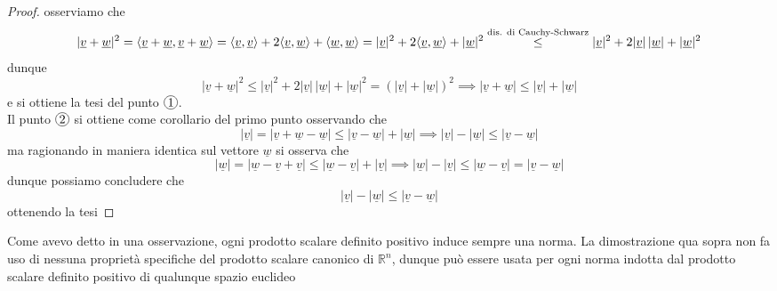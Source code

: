 \begin{proof}
osserviamo che
$$
|\underline{v} + \underline{w}|^2 = \langle \underline{v} + \underline{w}, \underline{v} + \underline{w} \rangle = \langle \underline{v}, \underline{v} \rangle + 2\langle \underline{v}, \underline{w} \rangle + \langle \underline{w}, \underline{w} \rangle = |\underline{v}|^2 + 2 \langle \underline{v}, \underline{w} \rangle + |\underline{w}|^2 \stackrel{\text{dis. di Cauchy-Schwarz}}{\leq} |\underline{v}|^2 + 2|\underline{v}| \, |\underline{w}| + |\underline{w}|^2
$$
dunque
$$
|\underline{v} + \underline{w}|^2 \leq |\underline{v}|^2 + 2|\underline{v}| \, |\underline{w}| + |\underline{w}|^2 = (|\underline{v}| + |\underline{w}|)^2 \implies |\underline{v} + \underline{w}| \leq |\underline{v}| + |\underline{w}|
$$
e si ottiene la tesi del punto $\circled{1}$. \\
Il punto $\circled{2}$ si ottiene come corollario del primo punto osservando che
$$
|\underline{v}| = |\underline{v} + \underline{w} - \underline{w}| \leq |\underline{v} - \underline{w}| + |\underline{w}| \implies |\underline{v}| - |\underline{w}| \leq |\underline{v} - \underline{w}| 
$$
ma ragionando in maniera identica sul vettore $\underline{w}$ si osserva che
$$
|\underline{w}| = |\underline{w} - \underline{v} + \underline{v}| \leq |\underline{w} - \underline{v}| + |\underline{v}| \implies |\underline{w}| - |\underline{v}| \leq |\underline{w} - \underline{v}|= |\underline{v} - \underline{w}|
$$
dunque possiamo concludere che
$$
|\underline{v}| - |\underline{w}| \leq |\underline{v} - \underline{w}|
$$
ottenendo la tesi
\end{proof}
\begin{remark}
Come avevo detto in una osservazione, ogni prodotto scalare definito positivo induce sempre una norma. La dimostrazione qua sopra non fa uso di nessuna proprietà specifiche del prodotto scalare canonico di $\mathbb{R}^n$, dunque può essere usata per ogni norma indotta dal prodotto scalare definito positivo di qualunque spazio euclideo
\end{remark}
